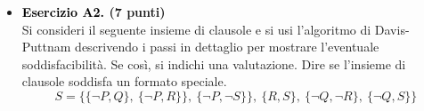 \documentclass[a4paper,10pt]{article}
\begin{document}
{\begin{itemize}[label=, leftmargin=0pt]
\begin{osservazioni}
    \textbf{Coppia nr. 2}\\
    Per quanto riguarda invece
    $$(\lnot A\lor B\lor C)\land(A\lor B)\quad B\lor C$$
    possiamo dire che, come ricordiamo, essa è una formula in forma CNF che ha il letterale $A$ e $\lnot A$ nelle due sue clausole. Si era provato che allora dato un valore fissato di $A$, la scelta sulla soddisfacibilità ricade su $B$ o $C$. A questo punto, dato che ciascuna delle scelte intorno a questi due letterali identifica un modello che soddisfa anche $\phi_2$, si ha che $\phi_1\models\phi_2$.
    
    
    \end{osservazioni}
    
    \item \textbf{\textcolor{black}{Esercizio A2.} (7 punti)} \\ 	
    Si consideri il seguente insieme di clausole e si usi l'algoritmo di Davis-Puttnam descrivendo i passi in dettaglio per mostrare l'eventuale soddisfacibilità. Se così, si indichi una valutazione. Dire se l'insieme di clausole soddisfa un formato speciale.
    $$ S = \{\{\lnot P,Q\},\ \{\lnot P,R\}\},\ \{\lnot P,\lnot S\}\},\ \{R,S\},\ \{\lnot Q,\lnot R\},\ \{\lnot Q,S\}\}$$


\end{itemize}}
\end{document}
